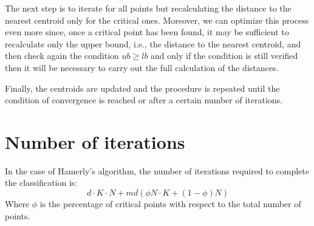 \documentclass{report}
\begin{document}
\begin{minipage}[b]{0.48\textwidth}
  The next step is to iterate for all points but recalculating the distance to the nearest centroid only for the critical ones. Moreover, we can optimize this process even more since, once a critical point has been found, it may be sufficient to recalculate only the upper bound, i.e., the distance to the nearest centroid, and then check again the condition $ub \geq lb$ and only if the condition is still verified then it will be necessary to carry out the full calculation of the distances.
  
  Finally, the centroids are updated and the procedure is repeated until the condition of convergence is reached or after a certain number of iterations.

  \section*{Number of iterations}
  In the case of Hamerly's algorithm, the number of iterations required to complete the classification is:
  \begin{equation}
      d\cdot K\cdot N + md(\phi N\cdot K + (1 - \phi)N)
      \label{eq:hamcomp}
  \end{equation}
  Where $\phi$ is the percentage of critical points with respect to the total number of points.
\end{minipage}

\newpage
\end{document}
